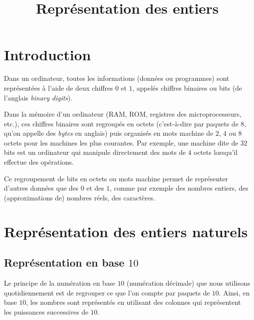 \documentclass[a4paper,dvipsnames]{article}
\title{Représentation des entiers}
\author{}
\date{}
\begin{document}
\renewcommand{\contentsname}{}

\pagestyle{fancy}

\begin{tcolorbox}[colframe=blue!75, colback=blue!45, valign=center, height=1.5cm, top=5mm]
  \maketitle
\end{tcolorbox}

\tableofcontents

\vspace{1cm}

\thispagestyle{fancy}

\section{Introduction}

Dans un ordinateur, toutes les informations (données ou programmes) sont représentées à l'aide de {\color{red}deux chiffres $0$ et $1$}, appelés chiffres binaires ou {\color{red}bits} (de l'anglais \textit{binary digits}).

\smallskip

Dans la mémoire d'un ordinateur (RAM, ROM, registres des microprocesseurs, etc.), ces chiffres binaires sont regroupés en {\color{red}octets} (c'est-à-dire par \og{}paquets\fg{} de $8$, qu'on appelle des \textit{bytes} en anglais) puis organisés en mots machine de $2$, $4$ ou $8$ octets pour les machines les plus courantes. Par exemple, une machine dite de $32$ bits est un ordinateur qui manipule directement des mots de $4$ octets lorsqu'il effectue des opérations.

\smallskip

Ce regroupement de bits en octets ou mots machine permet de {\color{red}représenter d'autres données} que des $0$ et des $1$, comme {\color{red}par exemple des nombres entiers, des (approximations de) nombres réels, des caractères.}
\section{Représentation des entiers naturels}

\subsection{Représentation en base $10$}

Le principe de la numération en base $10$ (numération décimale) que nous utilisons quotidiennement est de regrouper ce que l'on compte par paquets de $10$. Ainsi, en base $10$, les nombres sont représentés en utilisant des \og{}colonnes\fg{} qui représentent les puissances successives de $10$.
\end{document}
